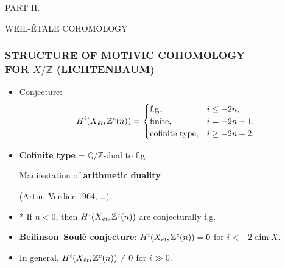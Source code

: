 \documentclass[handout]{beamer}
\newcommand{\QQ}{\mathbb{Q}}
\newcommand{\ZZ}{\mathbb{Z}}
\newcommand{\et}{\text{\it ét}}
\begin{document}

\begin{frame}[plain]
  \headingfont

  \begin{center}
    {\huge PART II.

      \vspace{1em}

      WEIL-ÉTALE COHOMOLOGY}
  \end{center}
\end{frame}


\begin{frame}
  \frametitle{STRUCTURE OF MOTIVIC COHOMOLOGY\\
    FOR $X/\ZZ$ (LICHTENBAUM)}

  \begin{itemize}
  \item<2-> Conjecture:
    \[ H^i (X_\et, \ZZ^c (n)) = \begin{cases}
        \text{f.g.}, & i \le -2n, \\
        \text{finite}, & i = -2n + 1, \\
        \text{cofinite type}, & i \ge -2n + 2.
    \end{cases} \]

  \item<3-> \textbf{Cofinite type} = $\QQ/\ZZ$-dual to f.g.

    Manifestation of \textbf{arithmetic duality}

    (Artin, Verdier 1964, \ldots).

  \item<4-> * If $n < 0$, then $H^i (X_\et, \ZZ^c (n))$ are conjecturally f.g.

  \item<5-> \textbf{Beilinson--Soulé conjecture}:
    $H^i (X_\et, \ZZ^c (n)) = 0$ for $i < -2\dim X$.

  \item<6-> In general, $H^i (X_\et, \ZZ^c (n)) \ne 0$ for $i \gg 0$.
  \end{itemize}
\end{frame}

\end{document}
